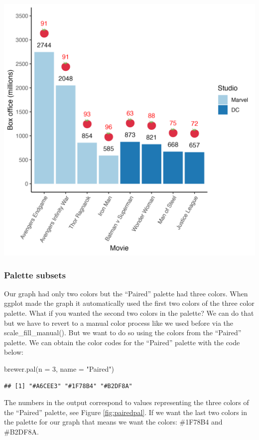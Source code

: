 \documentclass[
]{krantz}
\makeatletter
\newenvironment{Shaded}{\begin{snugshade}}{\end{snugshade}}
\newcommand{\AttributeTok}[1]{\textcolor[rgb]{0.61,0.61,0.61}{#1}}
\newcommand{\DecValTok}[1]{\textcolor[rgb]{0.06,0.06,0.06}{#1}}
\newcommand{\FunctionTok}[1]{\textcolor[rgb]{0,0,0}{#1}}
\newcommand{\NormalTok}[1]{#1}
\newcommand{\StringTok}[1]{\textcolor[rgb]{0.5,0.5,0.5}{#1}}
\newenvironment{kframe}{%
\medskip{}
\setlength{\fboxsep}{.8em}
 \def\at@end@of@kframe{}%
 \ifinner\ifhmode%
  \def\at@end@of@kframe{\end{minipage}}%
  \begin{minipage}{\columnwidth}%
 \fi\fi%
 \def\FrameCommand##1{\hskip\@totalleftmargin \hskip-\fboxsep
 \colorbox{shadecolor}{##1}\hskip-\fboxsep
     \hskip-\linewidth \hskip-\@totalleftmargin \hskip\columnwidth}%
 \MakeFramed {\advance\hsize-\width
   \@totalleftmargin\z@ \linewidth\hsize
   \@setminipage}}%
 {\par\unskip\endMakeFramed%
 \at@end@of@kframe}
\renewenvironment{Shaded}{\begin{kframe}}{\end{kframe}}
\makeatother
\begin{document}
\includegraphics[width=0.65\linewidth]{ch_graphing/images/emoji_graph4}

\hypertarget{palette-subsets}{%
\subsubsection{Palette subsets}\label{palette-subsets}}

Our graph had only two colors but the ``Paired'' palette had three colors. When ggplot made the graph it automatically used the first two colors of the three color palette. What if you wanted the second two colors in the palette? We can do that but we have to revert to a manual color process like we used before via the scale\_fill\_manual(). But we want to do so using the colors from the ``Paired'' palette. We can obtain the color codes for the ``Paired'' palette with the code below:

\begin{Shaded}
\begin{Highlighting}[]
\FunctionTok{brewer.pal}\NormalTok{(}\AttributeTok{n =} \DecValTok{3}\NormalTok{, }\AttributeTok{name =} \StringTok{"Paired"}\NormalTok{)}
\end{Highlighting}
\end{Shaded}

\begin{verbatim}
## [1] "#A6CEE3" "#1F78B4" "#B2DF8A"
\end{verbatim}

The numbers in the output correspond to values representing the three colors of the ``Paired'' palette, see Figure \ref{fig:pairedpal}. If we want the last two colors in the palette for our graph that means we want the colors: \#1F78B4 and \#B2DF8A.
\end{document}
